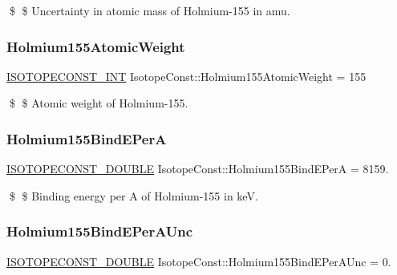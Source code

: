 \$ \$ Uncertainty in atomic mass of Holmium-\/155 in amu. \mbox{\label{group___isotope_const-_holmium-_ho155_ga8858465583e973787a65afed1b830c6d}} 
\subsubsection{\texorpdfstring{Holmium155\+Atomic\+Weight}{Holmium155AtomicWeight}}
{\footnotesize\ttfamily \mbox{\hyperlink{group___isotope_const-_macros_ga5f18360b3e99483a35c32d789e62621c}{I\+S\+O\+T\+O\+P\+E\+C\+O\+N\+S\+T\+\_\+\+I\+NT}} Isotope\+Const\+::\+Holmium155\+Atomic\+Weight = 155}

\$ \$ Atomic weight of Holmium-\/155. \mbox{\label{group___isotope_const-_holmium-_ho155_ga12718758f93174aba7a13121e333f3d8}} 
\subsubsection{\texorpdfstring{Holmium155\+Bind\+E\+PerA}{Holmium155BindEPerA}}
{\footnotesize\ttfamily \mbox{\hyperlink{group___isotope_const-_macros_ga8f45a7272ce02c0b4c65c44636ed719a}{I\+S\+O\+T\+O\+P\+E\+C\+O\+N\+S\+T\+\_\+\+D\+O\+U\+B\+LE}} Isotope\+Const\+::\+Holmium155\+Bind\+E\+PerA = 8159.}

\$ \$ Binding energy per A of Holmium-\/155 in keV. \mbox{\label{group___isotope_const-_holmium-_ho155_gaf18ea56a05a67adf2cd9b31fb30d7349}} 
\subsubsection{\texorpdfstring{Holmium155\+Bind\+E\+Per\+A\+Unc}{Holmium155BindEPerAUnc}}
{\footnotesize\ttfamily \mbox{\hyperlink{group___isotope_const-_macros_ga8f45a7272ce02c0b4c65c44636ed719a}{I\+S\+O\+T\+O\+P\+E\+C\+O\+N\+S\+T\+\_\+\+D\+O\+U\+B\+LE}} Isotope\+Const\+::\+Holmium155\+Bind\+E\+Per\+A\+Unc = 0.}

